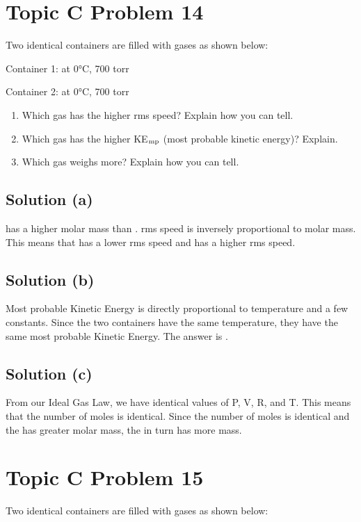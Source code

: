 \documentclass[10pt]{article}
\begin{document}
    \pagebreak
    \section{Topic C Problem 14}
        Two identical containers are filled with gases as shown below:
        
        Container 1:  at 0\unit{\celsius}, 700 torr
        
        Container 2:  at 0\unit{\celsius}, 700 torr
        \begin{enumerate} [label=\alph*)]
            \item Which gas has the higher rms speed? Explain how you can tell.
            \item Which gas has the higher KE$_{\rm mp}$ (most probable kinetic energy)? Explain.
            \item Which gas weighs more? Explain how you can tell.
        \end{enumerate}

        \subsection{Solution (a)}
             has a higher molar mass than . 
            rms speed is inversely proportional to molar mass.
            This means that  has a lower rms speed and  has a higher rms speed.

        \subsection{Solution (b)}
            Most probable Kinetic Energy is directly proportional to temperature and a few constants. 
            Since the two containers have the same temperature, they have the same most probable Kinetic Energy. 
            The answer is . 

        \subsection{Solution (c)}
            From our Ideal Gas Law, we have identical values of P, V, R, and T. 
            This means that the number of moles is identical. 
            Since the number of moles is identical and the  has greater molar mass, the  in turn has more mass. 

    \pagebreak
    \section{Topic C Problem 15}
        Two identical containers are filled with gases as shown below:
        
\end{document}
